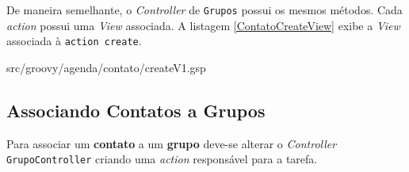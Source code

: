 \documentclass[12pt]{article}
\begin{document}
    De maneira semelhante, o \emph{Controller} de \texttt{Grupos} possui os mesmos métodos. 
    Cada \emph{action} possui uma  \emph{View} associada. A listagem \ref{ContatoCreateView} 
    exibe a \emph{View} associada à \texttt{action create}.
    
    
                   {src/groovy/agenda/contato/createV1.gsp}
    
\subsection{Associando Contatos a Grupos}

    Para associar um \textbf{contato} a um \textbf{grupo} deve-se alterar o \emph{Controller}
    \texttt{GrupoController} criando uma \emph{action} responsável para a tarefa.
    
    
%           



\end{document}
